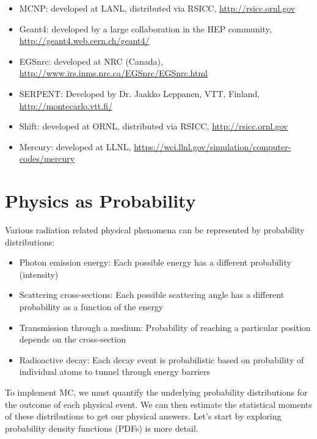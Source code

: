 \documentclass[12pt]{article}
\begin{document}
\begin{itemize}
  \item MCNP: developed at LANL, distributed via RSICC, \url{http://rsicc.ornl.gov}
  \item Geant4: developed by a large collaboration in the HEP community, \url{http://geant4.web.cern.ch/geant4/}
  \item EGSnrc: developed at NRC (Canada), \url{http://www.irs.inms.nrc.ca/EGSnrc/EGSnrc.html}
  \item SERPENT: Developed by Dr. Jaakko Leppanen, VTT, Finland, \url{http://montecarlo.vtt.fi/}
  \item Shift: developed at ORNL, distributed via RSICC, \url{http://rsicc.ornl.gov}
  \item Mercury: developed at LLNL, \url{https://wci.llnl.gov/simulation/computer-codes/mercury}
\end{itemize}

\section*{Physics as Probability}

Various radiation related physical phenomena can be represented by probability distributions:

\begin{itemize}
  \item Photon emission energy: Each possible energy has a different probability (intensity)
  \item Scattering cross-sections: Each possible scattering angle has a different probability as a function of the energy
  \item Transmission through a medium: Probability of reaching a particular position depends on the cross-section
  \item Radioactive decay: Each decay event is probabilistic based on probability of individual atoms to tunnel through energy barriers
\end{itemize}

To implement MC, we must quantify the underlying probability distributions for the outcome of each physical event. 
We can then estimate the statistical moments of these distributions to get our physical answers.
Let's start by exploring probability density functions (PDFs) is more detail.


\end{document}
